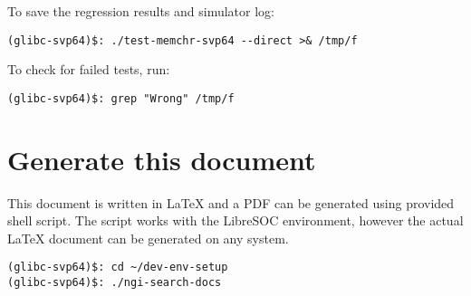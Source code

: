To save the regression results and simulator log:

\begin{verbatim}
(glibc-svp64)$: ./test-memchr-svp64 --direct >& /tmp/f
\end{verbatim}

To check for failed tests, run:

\begin{verbatim}
(glibc-svp64)$: grep "Wrong" /tmp/f
\end{verbatim}

\section{Generate this document}

This document is written in \LaTeX{} and a PDF can be generated using provided
shell script. The script works with the LibreSOC environment, however the
actual \LaTeX{} document can be generated on any system.

\begin{verbatim}
(glibc-svp64)$: cd ~/dev-env-setup
(glibc-svp64)$: ./ngi-search-docs
\end{verbatim}
